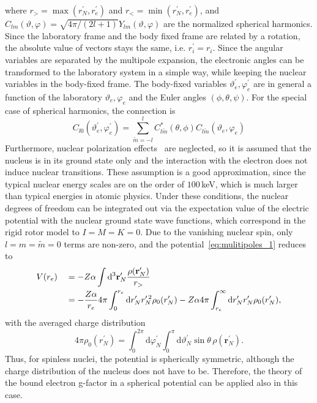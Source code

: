 where $r_>=\max(r^\prime_N,r^\prime_e)$ and $r_<=\min(r^\prime_N,r^\prime_e)$, and $C_{lm}(\vartheta,\varphi)=\sqrt{4\pi/(2l+1)}Y_{lm}(\vartheta,\varphi)$ are the normalized spherical harmonics. Since the laboratory frame and the body fixed frame are related by a rotation, the absolute value of vectors stays the same, i.e. $r^\prime_i = r_i$.
Since the angular variables are separated by the multipole expansion, the electronic angles can be transformed to the laboratory system in a simple way, while keeping the nuclear variables in the body-fixed frame. The body-fixed variables $\vartheta^{\prime}_e,\varphi^\prime_e$ are in general a function of the laboratory $\vartheta_e,\varphi_e$ and the Euler angles $(\phi,\theta,\psi)$. For the special case of spherical harmonics, the connection is
\begin{equation}
C_{l0}(\vartheta_e^\prime,\varphi_e^\prime) = \sum_{\tilde{m}=-l}^l C^{*}_{l\tilde{m}}(\theta,\phi)C_{l\tilde{m}}(\vartheta_e,\varphi_e)
\end{equation}
Furthermore, nuclear polarization effects~\cite{Nefiodov} are neglected, so it is assumed that the nucleus is in its ground state only and the interaction with the electron does not induce nuclear transitions. These assumption is a good approximation, since the typical nuclear energy scales are on the order of $100\,$keV, which is much larger than typical energies in atomic physics. Under these conditions, the nuclear degrees of freedom can be integrated out via the expectation value of the electric potential with the nuclear ground state wave functions, which correspond in the rigid rotor model to $I=M=K=0$. Due to the vanishing nuclear spin, only $l=m=\tilde{m}=0$ terms are non-zero, and the potential~\eqref{eq:mulitipoles_1} reduces to
\begin{alignat}{2}
\label{eq:gfac_monopole}
&V(r_e)&&=-Z\alpha \int\mathrm{d}^3\mathbf{r}^\prime_N\frac{\rho(\mathbf{r}_N^\prime)}{r_>}\\
& &&= -\frac{Z\alpha}{r_e} 4\pi\int_0^{r_e}\mathrm{d}r_N^\prime r_N^{\prime\,2}\rho_0(r_N^\prime) 
-Z\alpha 4\pi\int_{r_e}^\infty\mathrm{d}r_N^\prime r_N^{\prime}\rho_0(r_N^\prime), \notag
\end{alignat}
with the averaged charge distribution
\begin{equation}
\label{eq:rho_averaged}
4\pi\rho_0(r^\prime_N)=\int_0^{2\pi}\mathrm{d}\varphi_N^\prime \int_0^\pi \mathrm{d}\vartheta_N^\prime \sin\theta\,\rho(\mathbf{r}_N^\prime).
\end{equation}
Thus, for spinless nuclei, the potential is spherically symmetric, although the charge distribution of the nucleus does not have to be. Therefore, the theory of the bound electron g-factor in a spherical potential can be applied also in this case.

